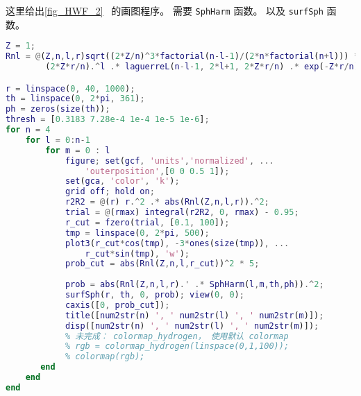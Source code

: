 
\begin{issues}
\issueDraft
\end{issues}


这里给出\autoref{fig_HWF_2}~ 的画图程序。 需要 \verb|SphHarm| 函数。 以及 \verb|surfSph| 函数。

\begin{lstlisting}[language=matlab, caption=hydrogen\_plot.m]
Z = 1;
Rnl = @(Z,n,l,r)sqrt((2*Z/n)^3*factorial(n-l-1)/(2*n*factorial(n+l))) *...
        (2*Z*r/n).^l .* laguerreL(n-l-1, 2*l+1, 2*Z*r/n) .* exp(-Z*r/n);

r = linspace(0, 40, 1000);
th = linspace(0, 2*pi, 361);
ph = zeros(size(th));
thresh = [0.3183 7.28e-4 1e-4 1e-5 1e-6];
for n = 4
    for l = 0:n-1
        for m = 0 : l
            figure; set(gcf, 'units','normalized', ...
                'outerposition',[0 0 0.5 1]);
            set(gca, 'color', 'k');
            grid off; hold on;
            r2R2 = @(r) r.^2 .* abs(Rnl(Z,n,l,r)).^2;
            trial = @(rmax) integral(r2R2, 0, rmax) - 0.95;
            r_cut = fzero(trial, [0.1, 100]);
            tmp = linspace(0, 2*pi, 500);
            plot3(r_cut*cos(tmp), -3*ones(size(tmp)), ...
                r_cut*sin(tmp), 'w');
            prob_cut = abs(Rnl(Z,n,l,r_cut))^2 * 5;
            
            prob = abs(Rnl(Z,n,l,r).' .* SphHarm(l,m,th,ph)).^2;
            surfSph(r, th, 0, prob); view(0, 0);
            caxis([0, prob_cut]);
            title([num2str(n) ', ' num2str(l) ', ' num2str(m)]);
            disp([num2str(n) ', ' num2str(l) ', ' num2str(m)]);
            % 未完成： colormap_hydrogen， 使用默认 colormap
            % rgb = colormap_hydrogen(linspace(0,1,100));
            % colormap(rgb);
       end
    end
end
\end{lstlisting}
